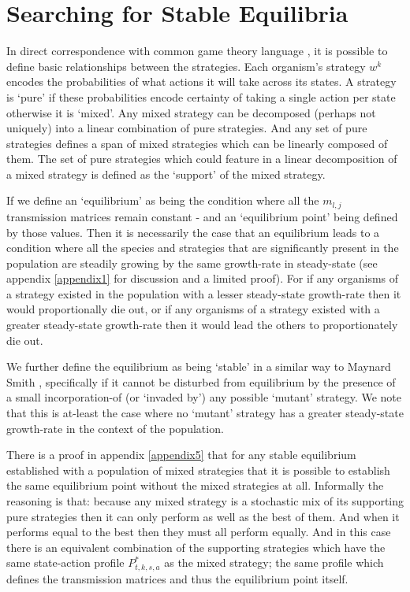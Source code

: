 \section{Searching for Stable Equilibria}\label{sec:equilibria}

In direct correspondence with common game theory language \cite{weibull}, it is possible to define basic relationships between the strategies.
Each organism's strategy $w^k$ encodes the probabilities of what actions it will take across its states.  A strategy is `pure' if these probabilities encode certainty of taking a single action per state otherwise it is `mixed'. Any mixed strategy can be decomposed (perhaps not uniquely) into a linear combination of pure strategies. And any set of pure strategies defines a span of mixed strategies which can be linearly composed of them.
The set of pure strategies which could feature in a linear decomposition of a mixed strategy is defined as the `support' of the mixed strategy.

If we define an `equilibrium' as being the condition where all the $m_{l,j}$ transmission matrices remain constant - and an `equilibrium point' being defined by those values.
Then it is necessarily the case that an equilibrium leads to a condition where all the species and strategies that are significantly present in the population are steadily growing by the same growth-rate in steady-state (see appendix \ref{appendix1} for discussion and a limited proof). For if any organisms of a strategy existed in the population with a lesser steady-state growth-rate then it would proportionally die out, or if any organisms of a strategy existed with a greater steady-state growth-rate then it would lead the others to proportionately die out.

We further define the equilibrium as being `stable' in a similar way to Maynard Smith \cite{maynard, maynard2, weibull}, specifically if it cannot be disturbed from equilibrium by the presence of a small incorporation-of (or `invaded by') any possible `mutant' strategy. We note that this is at-least the case where no `mutant' strategy has a greater steady-state growth-rate in the context of the population.

There is a proof in appendix \ref{appendix5} that for any stable equilibrium established with a population of mixed strategies that it is possible to establish the same equilibrium point without the mixed strategies at all.
Informally the reasoning is that: because any mixed strategy is a stochastic mix of its supporting pure strategies then it can only perform as well as the best of them. And when it performs equal to the best then they must all perform equally. And in this case there is an equivalent combination of the supporting strategies which have the same state-action profile $P^*_{t,k,s,a}$ as the mixed strategy; the same profile which defines the transmission matrices and thus the equilibrium point itself.

